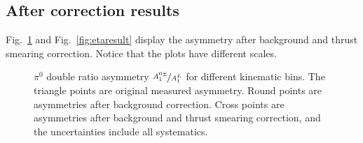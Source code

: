 \subsection{After correction results}
Fig.~\ref{fig:pi0result} and Fig.~\ref{fig:etaresult} display the asymmetry after background and thrust smearing correction. Notice that the plots have different scales.
\begin{figure}[H]
  \centering     
  \caption{$\pi^0$ double ratio asymmetry $\nicefrac{A^{0\pm}_1}{A^L_1}$ for different kinematic bins. The triangle points are original measured asymmetry. Round points are asymmetries after background correction. Cross points are asymmetries after background and thrust smearing correction, and the uncertainties include all systematics.}
  \label{fig:pi0result}
\end{figure}

